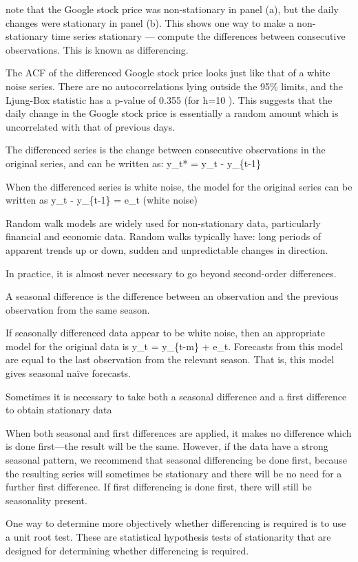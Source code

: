 \documentclass[]{book}
\begin{document}
note that the Google stock price was non-stationary in panel (a), but
the daily changes were stationary in panel (b). This shows one way to
make a non-stationary time series stationary --- compute the differences
between consecutive observations. This is known as differencing.

The ACF of the differenced Google stock price looks just like that of a
white noise series. There are no autocorrelations lying outside the 95\%
limits, and the Ljung-Box statistic has a p-value of 0.355 (for h=10 ).
This suggests that the daily change in the Google stock price is
essentially a random amount which is uncorrelated with that of previous
days.

The differenced series is the change between consecutive observations in
the original series, and can be written as: y\_t* = y\_t - y\_\{t-1\}

When the differenced series is white noise, the model for the original
series can be written as y\_t - y\_\{t-1\} = e\_t (white noise)

Random walk models are widely used for non-stationary data, particularly
financial and economic data. Random walks typically have: long periods
of apparent trends up or down, sudden and unpredictable changes in
direction.

In practice, it is almost never necessary to go beyond second-order
differences.

A seasonal difference is the difference between an observation and the
previous observation from the same season.

If seasonally differenced data appear to be white noise, then an
appropriate model for the original data is y\_t = y\_\{t-m\} + e\_t.
Forecasts from this model are equal to the last observation from the
relevant season. That is, this model gives seasonal naïve forecasts.

Sometimes it is necessary to take both a seasonal difference and a first
difference to obtain stationary data

When both seasonal and first differences are applied, it makes no
difference which is done first---the result will be the same. However,
if the data have a strong seasonal pattern, we recommend that seasonal
differencing be done first, because the resulting series will sometimes
be stationary and there will be no need for a further first difference.
If first differencing is done first, there will still be seasonality
present.

One way to determine more objectively whether differencing is required
is to use a unit root test. These are statistical hypothesis tests of
stationarity that are designed for determining whether differencing is
required.
\end{document}
